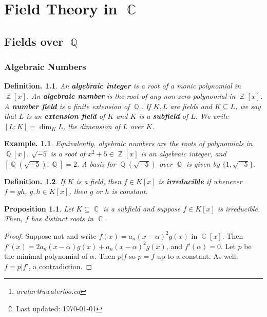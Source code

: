 \documentclass[11pt, a4paper]{memoir}
\title{\subject}
\author{Alex Rutar\thanks{\itshape arutar@uwaterloo.ca}\\ University of Waterloo}
\date{\semester\thanks{Last updated: \today}}
\DeclareMathOperator{\Q}{{\mathbb{Q}}}
\DeclareMathOperator{\Z}{{\mathbb{Z}}}
\DeclareMathOperator{\C}{{\mathbb{C}}}
\theoremstyle{change}
\newtheorem{proposition}[theorem]{Proposition}
\theoremstyle{plain}
\theoremstyle{nonumberplain}
\newtheorem{definition}{Definition.}
\newtheorem{example}{Example.}
\newtheorem{proof}{Proof}
\begin{document}
\hypersetup{pageanchor=false}
\maketitle
\newpage
\frontmatter
\hypersetup{pageanchor=true}
\tableofcontents*
\newpage
\mainmatter


\chapter{Field Theory in \texorpdfstring{$\C$}{C}}
\section{Fields over \texorpdfstring{$\Q$}{Q}}
\subsection{Algebraic Numbers}
\begin{definition}
    An \textbf{algebraic integer} is a root of a monic polynomial in $\Z[x]$.
    An \textbf{algebraic number} is the root of any non-zero polynomial in $\Z[x]$.
    A \textbf{number field} is a finite extension of $\Q$.
    If $K,L$ are fields and $K\subseteq L$, we say that $L$ is an \textbf{extension field} of $K$ and $K$ is a \textbf{subfield} of $L$.
    We write $[L:K]=\dim_KL$, the dimension of $L$ over $K$.
\end{definition}
\begin{example}
    Equivalently, algebraic numbers are the roots of polynomials in $\Q[x]$.
    $\sqrt{-5}$ is a root of $x^2+5\in\Z[x]$ is an algebraic integer, and $[\Q(\sqrt{-5}):\Q]=2$.
    A basis for $\Q(\sqrt{-5})$ over $\Q$ is given by $\{1,\sqrt{-5}\}$.
\end{example}
\begin{definition}
    If $K$ is a field, then $f\in K[x]$ is \textbf{irreducible} if whenever $f=gh$, $g,h\in K[x]$, then $g$ or $h$ is constant.
\end{definition}
\begin{proposition}
    Let $K\subseteq\C$ is a subfield and suppose $f\in K[x]$ is irreducible.
    Then, $f$ has distinct roots in $\C$.
\end{proposition}
\begin{proof}
    Suppose not and write $f(x)=a_n(x-\alpha)^2g(x)$ in $\C[x]$.
    Then $f'(x)=2a_n(x-\alpha)g(x)+a_n(x-\alpha)^2g(x)$, and $f'(\alpha)=0$.
    Let $p$ be the minimal polynomial of $\alpha$.
    Then $p|f$ so $p=f$ up to a constant.
    As well, $f=p|f'$, a contradiction.
\end{proof}
\end{document}
